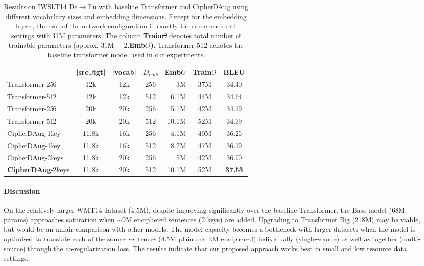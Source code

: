 \documentclass[11pt]{article}
\begin{document}
\begin{table*}[!t]
\small
\centering
\begin{tabular}{lcc|crc|c}
\toprule
 & \textbf{|src$\cup$tgt|} & \textbf{|vocab|} & \textbf{$D_{emb}$} & \textbf{Emb$\Theta$ } & \textbf{Train$\Theta$} & \textbf{BLEU} \\ \midrule
Transformer-256  & 12k & 12k & 256 & 3M & 37M & 34.40 \\
\cellcolor[HTML]{E8ECED}Transformer-512  & \cellcolor[HTML]{E8ECED}12k & \cellcolor[HTML]{E8ECED}12k & \cellcolor[HTML]{E8ECED}512 & \cellcolor[HTML]{E8ECED}6.1M & \cellcolor[HTML]{E8ECED}44M & \cellcolor[HTML]{E8ECED}34.64 \\
Transformer-256  & 20k & 20k & 256 & 5.1M & 42M & 34.19 \\
Transformer-512  & 20k & 20k & 512 & 10.1M & 52M & 34.39 \\ \midrule
CipherDAug-1key & 11.8k & 16k & 256 & 4.1M & 40M & 36.25 \\
CipherDAug-1key & 11.8k & 16k & 512 & 8.2M & 47M & 36.19 \\ \midrule
CipherDAug-2keys & 11.8k & 20k & 256 & 5M & 42M & 36.90 \\
\textbf{CipherDAug}-2keys & 11.8k & 20k & 512 & 10.1M & 52M & \textbf{37.53} \\
\bottomrule
\end{tabular}
\caption{Results on IWSLT14 De$\rightarrow$En with baseline Transformer and CipherDAug using different vocabulary sizes and embedding dimensions. Except for the embedding layers, the rest of the network configuration is exactly the same across all settings with 31M parameters. The column \textbf{Train$\Theta$} denotes total number of trainable parameters (approx. 31M + 2.\textbf{Emb$\Theta$)}. Transformer-512 denotes the baseline transformer model used in our experiments.}
\label{tab:vocab_compare}
\end{table*}

\paragraph{Discussion} On the relatively larger WMT14 dataset (4.5M), despite improving significantly over the baseline Transformer, the Base model (68M params) approaches saturation when $\sim$9M enciphered sentences (2 keys) are added. Upgrading to Transformer Big (218M) may be viable, but would be an unfair comparison with other models.
The model capacity becomes a bottleneck with larger datasets when the model is optimised to translate each of the source sentences (4.5M plain and 9M enciphered) individually (single-source) as well as together (multi-source) through the co-regularization loss. 
The results indicate that our proposed approach works best in small and low resource data settings. 
\end{document}
